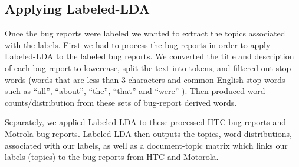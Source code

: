 \documentclass[10pt, conference, compsocconf]{IEEEtran}
\begin{document}
\subsection{Applying Labeled-LDA}





Once the bug reports were labeled we wanted to extract the topics
associated with the labels. First we had to process the bug reports 
in order to apply Labeled-LDA to the labeled bug reports. 
We converted the title and description of each bug report to lowercase,
split the text into tokens, and filtered out stop words (words that are less than 3 characters and
common English stop words such as ``all'', ``about'', ``the'',
``that'' and ``were'' ). Then produced word counts/distribution from
these sets of bug-report derived words.

Separately, we applied Labeled-LDA to these processed HTC bug reports and Motrola bug reports.
Labeled-LDA then outputs the topics, word distributions, associated
with our labels, as well as a document-topic matrix which links our
labels (topics) to the bug reports from HTC and Motorola.
\end{document}
